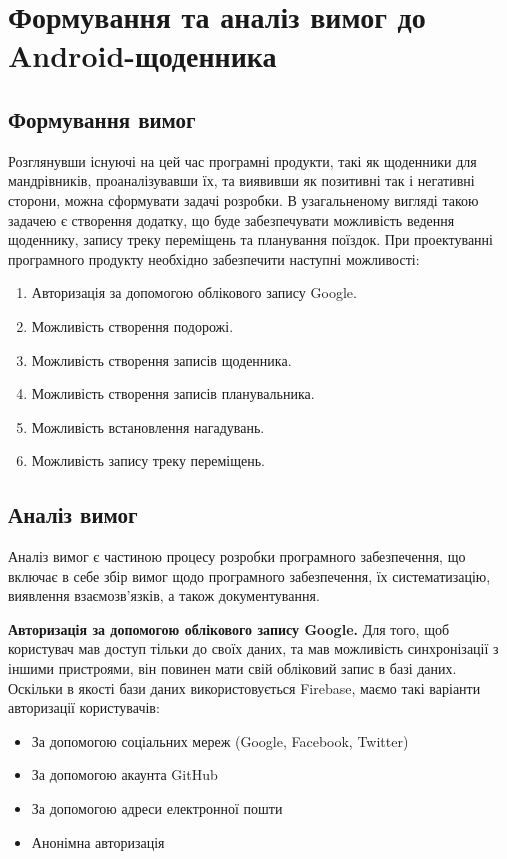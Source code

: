 \documentclass[../main.tex]{subfiles}
\begin{document}
\chapter{Формування та аналіз вимог до Android-щоденника}

\section{Формування вимог}

Розглянувши існуючі на цей час програмні продукти, такі як щоденники для мандрівників, проаналізувавши їх, та виявивши як позитивні так і негативні сторони, можна сформувати задачі розробки. В узагальненому вигляді такою задачею є створення додатку, що буде забезпечувати можливість ведення щоденнику, запису треку переміщень та планування поїздок.
При проектуванні програмного продукту необхідно забезпечити наступні можливості:

\begin{enumerate}
	\item Авторизація за допомогою облікового запису Google.
	\item Можливість створення подорожі.
	\item Можливість створення записів щоденника.
	\item Можливість створення записів планувальника.
	\item Можливість встановлення нагадувань.
	\item Можливість запису треку переміщень.
\end{enumerate}

\section{Аналіз вимог}

Аналіз вимог є частиною процесу розробки програмного забезпечення, що включає в себе збір вимог щодо програмного забезпечення, їх систематизацію, виявлення взаємозв'язків, а також документування.

{\bfseries{Авторизація за допомогою облікового запису Google.}}
Для того, щоб користувач мав доступ тільки до своїх даних, та мав можливість синхронізації з іншими пристроями, він повинен мати свій обліковий запис в базі даних. Оскільки в якості бази даних використовується Firebase, маємо такі варіанти авторизації користувачів: 
\begin{itemize}
	\item За допомогою соціальних мереж (Google, Facebook, Twitter)
	\item За допомогою акаунта GitHub
	\item За допомогою адреси електронної пошти
	\item Анонімна авторизація
\end{itemize}
\end{document}
